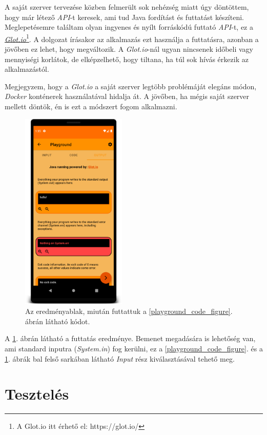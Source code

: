 \documentclass[12pt,a4paper]{article}
\begin{document}
	A saját szerver tervezése közben felmerült sok nehézség miatt úgy döntöttem, hogy már létező \textit{API}-t keresek, ami tud Java fordítást és futtatást készíteni.
	Meglepetésemre találtam olyan ingyenes és nyílt forráskódú futtató \textit{API}-t, ez a \href{https://glot.io/}{\textit{Glot.io}}\footnote{A Glot.io itt érhető el: https://glot.io/}. A dolgozat írásakor az alkalmazás ezt használja a futtatásra, azonban a jövőben ez lehet, hogy megváltozik. A \textit{Glot.io}-nál ugyan nincsenek időbeli vagy mennyiségi korlátok, de elképzelhető, hogy tiltana, ha túl sok hívás érkezik az alkalmazástól.
	
	Megjegyzem, hogy a \textit{Glot.io} a saját szerver legtöbb problémáját elegáns módon, \textit{Docker} konténerek használatával hidalja át. A jövőben, ha mégis saját szerver mellett döntök, én is ezt a módszert fogom alkalmazni.

	\begin{figure}[h!]
		\centering
		\includegraphics[width=5cm]{playground_output}
		\caption{Az eredményablak, miután futtattuk a \ref{playground_code_figure}. ábrán látható kódot.}
		\label{playground_output_figure}
	\end{figure}

	A \ref{playground_output_figure}. ábrán látható a futtatás eredménye. Bemenet megadására is lehetőség van, ami standard inputra (\textit{System.in}) fog kerülni, ez a \ref{playground_code_figure}. és a \ref{playground_output_figure}. ábrák bal felső sarkában látható \textit{Input} rész kiválasztásával tehető meg.

	\section{Tesztelés}
\end{document}
